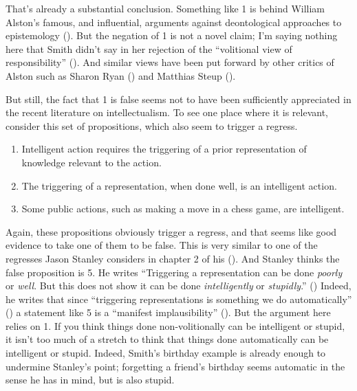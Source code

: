 \documentclass[
  11pt,
  letterpaper,
  DIV=11,
  numbers=noendperiod,
  oneside]{scrartcl}
\providecommand{\tightlist}{%
  \setlength{\itemsep}{0pt}\setlength{\parskip}{0pt}}\usepackage{longtable,booktabs,array}
\begin{document}
That's already a substantial conclusion. Something like 1 is behind
William Alston's famous, and influential, arguments against
deontological approaches to epistemology
(). But the negation of 1 is not a
novel claim; I'm saying nothing here that Smith didn't say in her
rejection of the ``volitional view of responsibility''
(). And similar views
have been put forward by other critics of Alston such as Sharon Ryan
() and Matthias Steup
().

But still, the fact that 1 is false seems not to have been sufficiently
appreciated in the recent literature on intellectualism. To see one
place where it is relevant, consider this set of propositions, which
also seem to trigger a regress.

\begin{enumerate}
\def\labelenumi{\arabic{enumi}.}
\setcounter{enumi}{3}
\tightlist
\item
  Intelligent action requires the triggering of a prior representation
  of knowledge relevant to the action.
\item
  The triggering of a representation, when done well, is an intelligent
  action.
\item
  Some public actions, such as making a move in a chess game, are
  intelligent.
\end{enumerate}

Again, these propositions obviously trigger a regress, and that seems
like good evidence to take one of them to be false. This is very similar
to one of the regresses Jason Stanley considers in chapter 2 of his
(). And Stanley thinks the false
proposition is 5. He writes ``Triggering a representation can be done
\emph{poorly} or \emph{well}. But this does not show it can be done
\emph{intelligently} or \emph{stupidly}.''
() Indeed, he writes that
since ``triggering representations is something we do automatically''
() a statement like 5 is a
``manifest implausibility'' (). But the argument here relies on 1. If you think things done
non-volitionally can be intelligent or stupid, it isn't too much of a
stretch to think that things done automatically can be intelligent or
stupid. Indeed, Smith's birthday example is already enough to undermine
Stanley's point; forgetting a friend's birthday seems automatic in the
sense he has in mind, but is also stupid.
\end{document}

